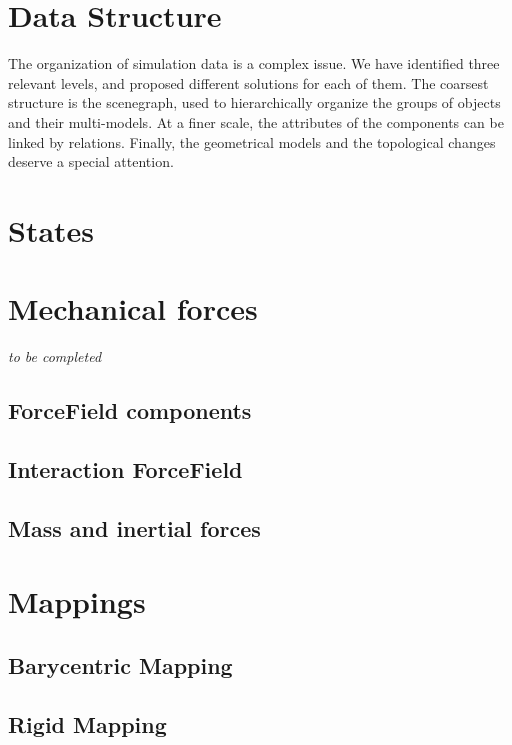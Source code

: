 \documentclass[a4paper,10pt]{report}
\begin{document}
\chapter{Data Structure}
The organization of simulation data is a complex issue. We have identified three relevant levels, and proposed different solutions for each of them.
The coarsest structure is the scenegraph, used to hierarchically organize the groups of objects and their multi-models.
At a finer scale, the attributes of the components can be linked by relations.
Finally, the geometrical models and the topological changes deserve a special attention.
\graphicspath{{../datastructure/}}  %




\chapter{States}
\graphicspath{{../states/}}  %



\chapter{Mechanical forces}
\emph{to be completed}
\section{ForceField components}

\section{Interaction ForceField}
\label{sec:interactionforcefield}

\section{Mass and inertial forces}

\chapter{Mappings}

\section{Barycentric Mapping}
\section{Rigid Mapping}
\end{document}
